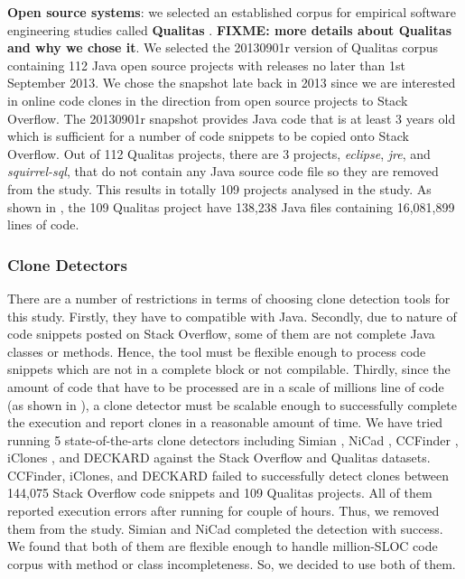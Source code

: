 \documentclass{sig-alternate-05-2015}
\newcommand\FIXME[1]{\textbf{FIXME: #1}}
\begin{document}
\textbf{Open source systems}: we selected an established corpus for empirical software engineering studies called \textbf{Qualitas} \cite{QualitasCorpus}. \FIXME{more details about Qualitas and why we chose it}. We selected the 20130901r version of Qualitas corpus containing 112 Java open source projects with releases no later than 1st September 2013. We chose the snapshot late back in 2013 since we are interested in online code clones in the direction from open source projects to Stack Overflow. The 20130901r snapshot provides Java code that is at least 3 years old which is sufficient for a number of code snippets to be copied onto Stack Overflow. Out of 112 Qualitas projects, there are 3 projects, \textit{eclipse}, \textit{jre}, and \textit{squirrel-sql}, that do not contain any Java source code file so they are removed from the study. This results in totally 109 projects analysed in the study. As shown in , the 109 Qualitas project have 138,238 Java files containing 16,081,899 lines of code. %

\subsubsection{Clone Detectors}
There are a number of restrictions in terms of choosing clone detection tools for this study. Firstly, they have to compatible with Java. Secondly, due to nature of code snippets posted on Stack Overflow, some of them are not complete Java classes or methods. Hence, the tool must be flexible enough to process code snippets which are not in a complete block or not compilable. Thirdly, since the amount of code that have to be processed are in a scale of millions line of code (as shown in ), a clone detector must be scalable enough to successfully complete the execution and report clones in a reasonable amount of time. We have tried running 5 state-of-the-arts clone detectors including Simian \cite{simian}, NiCad \cite{Cordy,Roy2008}, CCFinder \cite{Kamiya2002}, iClones \cite{Gode2009}, and DECKARD \cite{Jiang2007a} against the Stack Overflow and Qualitas datasets. CCFinder, iClones, and DECKARD failed to successfully detect clones between 144,075 Stack Overflow code snippets and 109 Qualitas projects. All of them reported execution errors after running for couple of hours. Thus, we removed them from the study. Simian and NiCad completed the detection with success. We found that both of them are flexible enough to handle million-SLOC code corpus with method or class incompleteness. So, we decided to use both of them.
\end{document}
